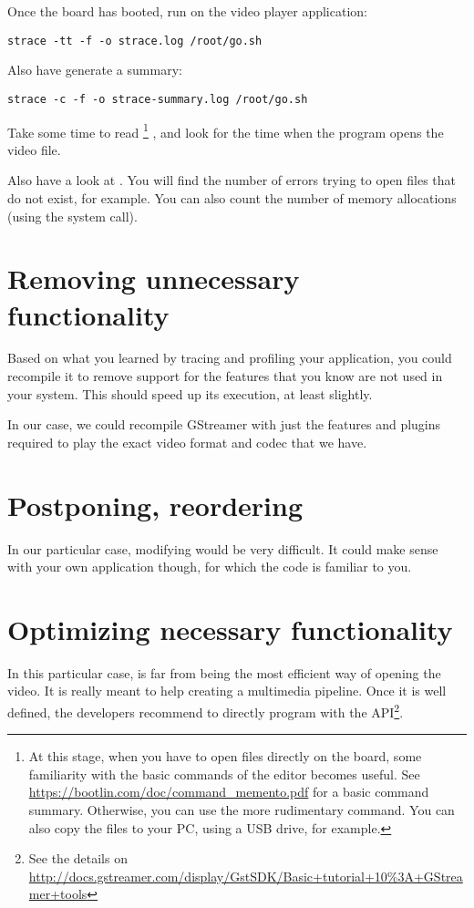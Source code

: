 Once the board has booted, run  on the video player
application:

\begin{verbatim}
strace -tt -f -o strace.log /root/go.sh
\end{verbatim}

Also have  generate a summary:

\begin{verbatim}
strace -c -f -o strace-summary.log /root/go.sh
\end{verbatim}

Take some time to read \footnote{
At this stage, when you have to open files directly on the
board, some familiarity with the basic commands of the  editor
becomes useful. See
\url{https://bootlin.com/doc/command_memento.pdf} for a basic
command summary. Otherwise, you can use the more rudimentary 
command. You can also copy the files to your PC, using a USB drive, for
example.}
, and look for the time when the program opens the video file.

Also have a look at . You will find the number
of errors trying to open files that do not exist, for example. You can
also count the number of memory allocations (using the  system call).

\section{Removing unnecessary functionality}

Based on what you learned by tracing and profiling your application, you
could recompile it to remove support for the features that you know are
not used in your system. This should speed up its execution, at least
slightly.

In our case, we could recompile GStreamer with just the features
and plugins required to play the exact video format and codec that we
have.

\section{Postponing, reordering}

In our particular case, modifying  would be very
difficult. It could make sense with your own application though, for
which the code is familiar to you.

\section{Optimizing necessary functionality}

In this particular case,  is far from being the most
efficient way of opening the video. It is really meant to help creating
a multimedia pipeline. Once it is well defined, the 
developers recommend to directly program with the 
API\footnote{See the details on
\url{http://docs.gstreamer.com/display/GstSDK/Basic+tutorial+10\%3A+GStreamer+tools}}.
